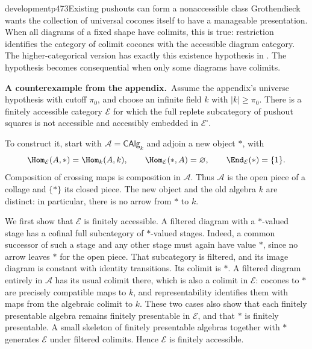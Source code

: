 \begin{dcomment}{development}{p473}{Existing pushouts can form a nonaccessible class}
Grothendieck wants the collection of universal cocones itself to have a manageable presentation. When all diagrams of a fixed shape have colimits, this is true: restriction identifies the category of colimit cocones with the accessible diagram category. The higher-categorical version has exactly this existence hypothesis in \citet[Example~5.4.7.9]{Lurie2009HTT}. The hypothesis becomes consequential when only some diagrams have colimits.

\textbf{A counterexample from the appendix.}\ours\
Assume the appendix's universe hypothesis with cutoff $\pi_0$, and choose an infinite field $k$ with $|k|\ge\pi_0$. There is a finitely accessible category $\mathcal E$ for which the full replete subcategory of pushout squares is not accessible and accessibly embedded in $\mathcal E^\square$.

To construct it, start with $\mathcal A=\mathsf{CAlg}_k$ and adjoin a new object $*$, with
\[
 \Hom_{\mathcal E}(A,*)=\Hom_k(A,k),\qquad
 \Hom_{\mathcal E}(*,A)=\varnothing,\qquad
 \End_{\mathcal E}(*)=\{1\}.
\]
Composition of crossing maps is composition in $\mathcal A$. Thus $\mathcal A$ is the open piece of a collage and $\{*\}$ its closed piece. The new object and the old algebra $k$ are distinct: in particular, there is no arrow from $*$ to $k$.

We first show that $\mathcal E$ is finitely accessible. A filtered diagram with a $*$-valued stage has a cofinal full subcategory of $*$-valued stages. Indeed, a common successor of such a stage and any other stage must again have value $*$, since no arrow leaves $*$ for the open piece. That subcategory is filtered, and its image diagram is constant with identity transitions. Its colimit is $*$. A filtered diagram entirely in $\mathcal A$ has its usual colimit there, which is also a colimit in $\mathcal E$: cocones to $*$ are precisely compatible maps to $k$, and representability identifies them with maps from the algebraic colimit to $k$. These two cases also show that each finitely presentable algebra remains finitely presentable in $\mathcal E$, and that $*$ is finitely presentable. A small skeleton of finitely presentable algebras together with $*$ generates $\mathcal E$ under filtered colimits. Hence $\mathcal E$ is finitely accessible.


\end{dcomment}
